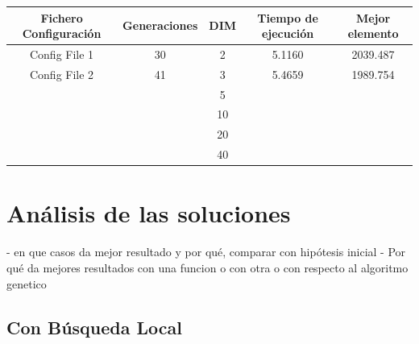 \begin{tabular}{|c|c|c|c|c|}
    \hline
    \textbf{Fichero Configuración} & \textbf{Generaciones} & \textbf{DIM} & \textbf{Tiempo de ejecución} & \textbf{Mejor elemento} \\ \hline
    Config File 1   & 30    & 2   & 5.1160  & 2039.487   \\ \hline
    Config File 2   & 41    & 3   & 5.4659  & 1989.754     \\ \hline
                                                &                  & 5             &                              &                         \\ \hline
                                                &                  & 10             &                              &                         \\ \hline
                                                &                  & 20             &                              &                         \\ \hline
                                                &                  & 40             &                              &                         \\ \hline

\end{tabular}


\section{Análisis de las soluciones}

- en que casos da mejor resultado y por qué, comparar con hipótesis inicial
- Por qué da mejores resultados con una funcion o con otra o con respecto al algoritmo genetico


\subsection{Con Búsqueda Local}

